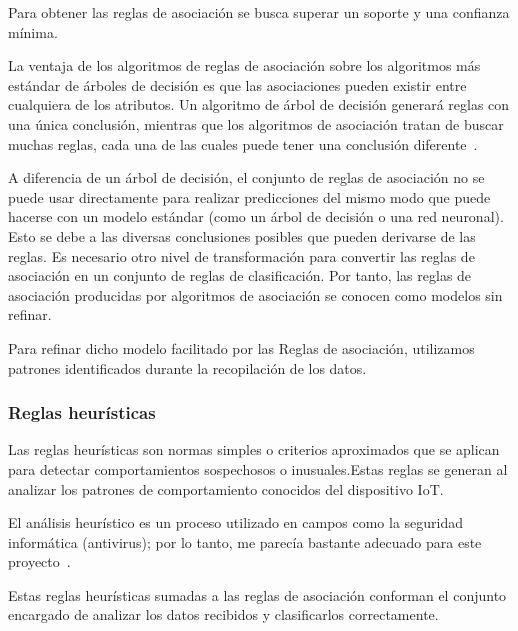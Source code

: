 Para obtener las reglas de asociación se busca superar un soporte y una confianza mínima.  

La ventaja de los algoritmos de reglas de asociación sobre los algoritmos más estándar de árboles de decisión es que las asociaciones pueden existir entre cualquiera de los atributos. Un algoritmo de árbol de decisión generará reglas con una única conclusión, mientras que los algoritmos de asociación tratan de buscar muchas reglas, cada una de las cuales puede tener una conclusión diferente~\cite{DTM:Aso}.

 A diferencia de un árbol de decisión, el conjunto de reglas de asociación no se puede usar directamente para realizar predicciones del mismo modo que puede hacerse con un modelo estándar (como un árbol de decisión o una red neuronal). Esto se debe a las diversas conclusiones posibles que pueden derivarse de las reglas. Es necesario otro nivel de transformación para convertir las reglas de asociación en un conjunto de reglas de clasificación. Por tanto, las reglas de asociación producidas por algoritmos de asociación se conocen como modelos sin refinar.

 Para refinar dicho modelo facilitado por las Reglas de asociación, utilizamos patrones identificados durante la recopilación de los datos. 

\subsubsection{Reglas heurísticas}
Las reglas heurísticas son normas simples o criterios aproximados que se aplican para detectar comportamientos sospechosos o inusuales.Estas reglas se generan al analizar los patrones de comportamiento conocidos del dispositivo IoT.

El análisis heurístico es un proceso utilizado en campos como la seguridad informática (antivirus); por lo tanto, me parecía bastante adecuado para este proyecto~\cite{Heu:Sec}.

Estas reglas heurísticas sumadas a las reglas de asociación conforman el conjunto encargado de analizar los datos recibidos y clasificarlos correctamente.












